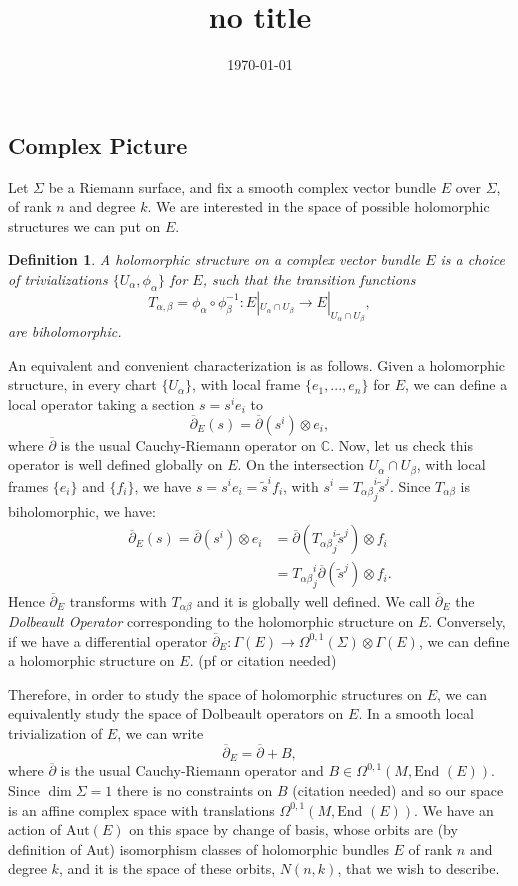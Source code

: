 \documentclass[]{article}
\title{no title}
\date{\today}
\newtheorem{definition}{Definition}
\newcommand{\End}{\text{End }}
\newcommand{\dbar}{\overline{\partial}}
\begin{document}
	\subsection{Complex Picture}
	Let $\Sigma$ be a Riemann surface, and fix a smooth complex vector bundle $E$ over $\Sigma$, of rank $n$ and degree $k$. We are interested in the space of possible holomorphic structures we can put on $E$.
	\begin{definition}
		A \textit{holomorphic structure} on a complex vector bundle $E$ is a choice of trivializations $\{U_\alpha, \phi_\alpha\}$ for $E$, such that the transition functions
		\begin{equation*}
			T_{\alpha,\beta} = \phi_\alpha \circ \phi^{-1}_\beta: E|_{U_\alpha \cap U_\beta} \to E|_{U_\alpha \cap U_\beta},
		\end{equation*}
		are biholomorphic. 
	\end{definition}
	 An equivalent and convenient characterization is as follows. Given a holomorphic structure, in every chart $\{U_\alpha\}$, with local frame $\{e_1,...,e_n\}$ for $E$, we can define a local operator taking a section $s = s^i e_i$ to
	\begin{equation*}
		\dbar_E(s) = \dbar(s^i)\otimes e_i,
	\end{equation*}
	where $\dbar$ is the usual Cauchy-Riemann operator on $\mathbb{C}$. Now, let us check this operator is well defined globally on $E$. On the intersection $U_\alpha \cap U_\beta$, with local frames $\{e_i\}$ and $\{f_i\}$, we have $s = s^i e_i = \tilde{s}^i f_i$, with $s^i = {T_{\alpha\beta}}^i_j\tilde{s}^j.$ Since $T_{\alpha\beta}$ is biholomorphic, we have:
	\begin{align*}
		\dbar_E(s) = \dbar(s^i)\otimes e_i &= \dbar({T_{\alpha\beta}}^i_j \tilde{s}^j)\otimes f_i\\
		&= {T_{\alpha\beta}}^i_j \dbar(\tilde{s}^j)\otimes f_i.
	\end{align*}
	Hence $\dbar_E$ transforms with $T_{\alpha\beta}$ and it is globally well defined. We call $\dbar_E$ the \textit{Dolbeault Operator} corresponding to the holomorphic structure on $E$. Conversely, if we have a differential operator $\dbar_E:\Gamma(E) \to \Omega^{0,1}(\Sigma)\otimes \Gamma(E)$, we can define a holomorphic structure on $E$. (pf or citation needed)
	
	Therefore, in order to study the space of holomorphic structures on $E$, we can equivalently study the space of Dolbeault operators on $E$. In a smooth local trivialization of $E$, we can write 
	\begin{equation*}
		\dbar_E = \dbar + B,
	\end{equation*}
	where $\dbar$ is the usual Cauchy-Riemann operator and $B \in \Omega^{0,1}(M, \End(E))$. Since $\dim \Sigma = 1$ there is no constraints on $B$ (citation needed) and so our space is an affine complex space with translations $\Omega^{0,1}(M,\End(E))$. We have an action of $\text{Aut}(E)$ on this space by change of basis, whose orbits are (by definition of Aut) isomorphism classes of holomorphic bundles $E$ of rank $n$ and degree $k$, and it is the space of these orbits, $N(n,k)$, that we wish to describe. 
	
\end{document}
